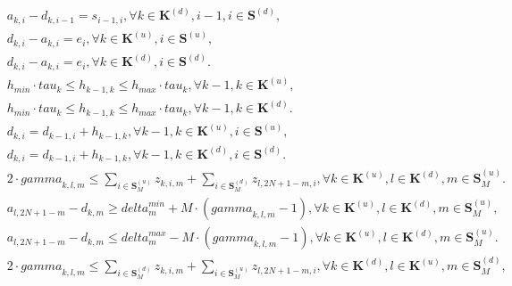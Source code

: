 \begin{align}
  & a_{k , i} - d_{k , i - 1} = s_{i - 1 , i} , \forall k \in \mathbf{K}^{\left(d\right)} , i - 1 , i \in \mathbf{S}^{\left(d\right)} , \tag{eq\_0014} \\
  & d_{k , i} - a_{k , i} = e_{i} , \forall k \in \mathbf{K}^{\left(u\right)} , i \in \mathbf{S}^{\left(u\right)} , \tag{eq\_0015} \\
  & d_{k , i} - a_{k , i} = e_{i} , \forall k \in \mathbf{K}^{\left(d\right)} , i \in \mathbf{S}^{\left(d\right)} . \tag{eq\_0016} \\
  & h_{m i n} \cdot \mathit{tau}_{k} \leq h_{k - 1 , k} \leq h_{m a x} \cdot \mathit{tau}_{k} , \forall k - 1 , k \in \mathbf{K}^{\left(u\right)} , \tag{eq\_0018} \\
  & h_{m i n} \cdot \mathit{tau}_{k} \leq h_{k - 1 , k} \leq h_{m a x} \cdot \mathit{tau}_{k} , \forall k - 1 , k \in \mathbf{K}^{\left(d\right)} . \tag{eq\_0019} \\
  & d_{k , i} = d_{k - 1 , i} + h_{k - 1 , k} , \forall k - 1 , k \in \mathbf{K}^{\left(u\right)} , i \in \mathbf{S}^{\left(u\right)} , \tag{eq\_0020} \\
  & d_{k , i} = d_{k - 1 , i} + h_{k - 1 , k} , \forall k - 1 , k \in \mathbf{K}^{\left(d\right)} , i \in \mathbf{S}^{\left(d\right)} . \tag{eq\_0021} \\
  & 2 \cdot \mathit{gamma}_{k , l , m} \leq \sum_{i \in \mathbf{S}_{M}^{\left(u\right)}} z_{k , i , m} + \sum_{i \in \mathbf{S}_{M}^{\left(d\right)}} z_{l , 2 N + 1 - m , i} , \forall k \in \mathbf{K}^{\left(u\right)} , l \in \mathbf{K}^{\left(d\right)} , m \in \mathbf{S}_{M}^{\left(u\right)} . \tag{eq\_0022} \\
  & a_{l , 2 N + 1 - m} - d_{k , m} \geq \mathit{delta}_{m}^{m i n} + M \cdot \left(\mathit{gamma}_{k , l , m} - 1\right) , \forall k \in \mathbf{K}^{\left(u\right)} , l \in \mathbf{K}^{\left(d\right)} , m \in \mathbf{S}_{M}^{\left(u\right)} , \tag{eq\_0024} \\
  & a_{l , 2 N + 1 - m} - d_{k , m} \leq \mathit{delta}_{m}^{m a x} - M \cdot \left(\mathit{gamma}_{k , l , m} - 1\right) , \forall k \in \mathbf{K}^{\left(u\right)} , l \in \mathbf{K}^{\left(d\right)} , m \in \mathbf{S}_{M}^{\left(u\right)} . \tag{eq\_0025} \\
  & 2 \cdot \mathit{gamma}_{k , l , m} \leq \sum_{i \in \mathbf{S}_{M}^{\left(d\right)}} z_{k , i , m} + \sum_{i \in \mathbf{S}_{M}^{\left(u\right)}} z_{l , 2 N + 1 - m , i} , \forall k \in \mathbf{K}^{\left(d\right)} , l \in \mathbf{K}^{\left(u\right)} , m \in \mathbf{S}_{M}^{\left(d\right)} , \tag{eq\_0026} \\

\end{align}
